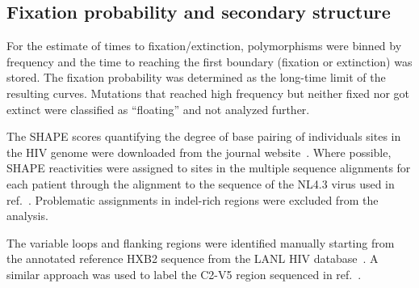 \documentclass[rmp, twocolumn]{revtex4}
\begin{document}
\subsection{Fixation probability and secondary structure}
For the estimate of times to fixation/extinction, polymorphisms were
binned by frequency and the time to reaching the first boundary (fixation or
extinction) was stored. The fixation probability was determined as the long-time
limit of the resulting curves. Mutations that reached high frequency but neither
fixed nor got extinct were classified as ``floating'' and not analyzed further.

The SHAPE scores quantifying the degree of base pairing of individuals sites in
the HIV genome were downloaded from the journal
website~\citep{watts_architecture_2009}.
Where possible, SHAPE reactivities were assigned to sites in the multiple
sequence alignments for each patient through the alignment to the sequence
of the NL4.3 virus used in ref.~\citep{watts_architecture_2009}. Problematic
assignments in indel-rich regions were excluded from the analysis.

The variable loops and flanking regions were identified manually starting from
the annotated reference HXB2 sequence from the LANL HIV database~\citep{LANL2012}. A
similar approach was used to label the C2-V5 region sequenced in
ref.~\citep{shankarappa_consistent_1999}.

\end{document}
